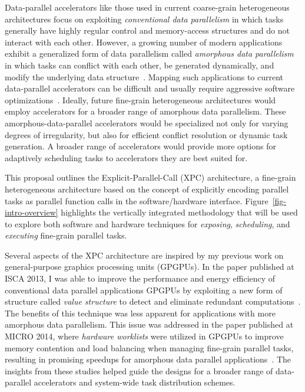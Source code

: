 Data-parallel accelerators like those used in current coarse-grain
heterogeneous architectures focus on exploiting \emph{conventional data
  parallelism} in which tasks generally have highly regular control and
memory-access structures and do not interact with each other.  However, a
growing number of modern applications exhibit a generalized form of data
parallelism called \emph{amorphous data parallelism} in which tasks can
conflict with each other, be generated dynamically, and modify the
underlying data structure~\cite{pingali-tao-pldi2011}. Mapping such
applications to current data-parallel accelerators can be difficult and
usually require aggressive software
optimizations~\cite{luo-gpu-bfs-dac2010,harish-large-graph-gpu-hipc2007,
  hong-cuda-max-warp-ppopp2011,nasre-data-vs-topo-ipdps2013,
  nasre-morph-ppopp2013,mendez-optimizations-amorphous-ppopp2010,
  mendez-gpu-pta-ppopp2012}. Ideally, future fine-grain heterogeneous
architectures would employ accelerators for a broader range of amorphous
data parallelism. These amorphous-data-parallel accelerators would be
specialized not only for varying degrees of irregularity, but also for
efficient conflict resolution or dynamic task generation. A broader range
of accelerators would provide more options for adaptively scheduling
tasks to accelerators they are best suited for.

This proposal outlines the Explicit-Parallel-Call (XPC) architecture, a
fine-grain heterogeneous architecture based on the concept of explicitly
encoding parallel tasks as parallel function calls in the software/hardware
interface. Figure~\ref{fig-intro-overview} highlights the vertically
integrated methodology that will be used to explore both software and
hardware techniques for \emph{exposing}, \emph{scheduling}, and
\emph{executing} fine-grain parallel tasks.

Several aspects of the XPC architecture are inspired by my previous work
on general-purpose graphics processing units (GPGPUs). In the paper
published at ISCA 2013, I was able to improve the performance and energy
efficiency of conventional data parallel applications GPGPUs by
exploiting a new form of structure called \emph{value structure} to
detect and eliminate redundant
computations~\cite{kim-simt-vstruct-isca2013}. The benefits of this
technique was less apparent for applications with more amorphous data
parallelism. This issue was addressed in the paper published at MICRO
2014, where \emph{hardware worklists} were utilized in GPGPUs to improve
memory contention and load balancing when managing fine-grain parallel
tasks, resulting in promising speedups for amorphous data parallel
applications~\cite{kim-hwwl-micro2014}. The insights from these studies
helped guide the designs for a broader range of data-parallel
accelerators and system-wide task distribution schemes.
